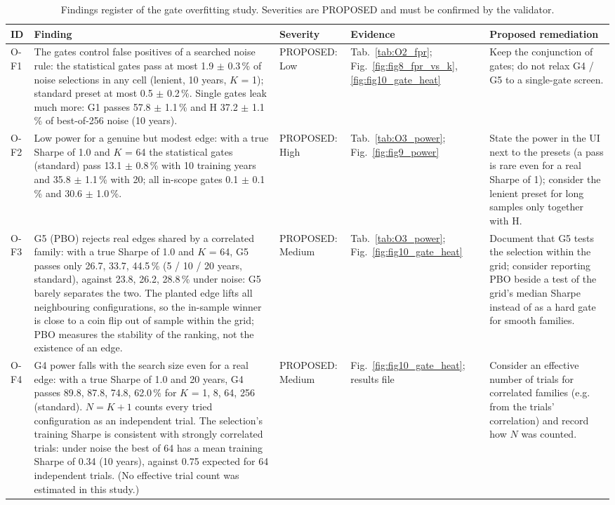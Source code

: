 \begin{table}[H]
\centering
\scriptsize
\caption{Findings register of the gate overfitting study. Severities are PROPOSED and must be confirmed by the validator.}
\label{tab:O6_findings}
\setlength{\tabcolsep}{3pt}
\begin{tabular}{>{\raggedright\arraybackslash}p{0.75cm}>{\raggedright\arraybackslash}p{6.8cm}>{\raggedright\arraybackslash}p{1.85cm}>{\raggedright\arraybackslash}p{2.2cm}>{\raggedright\arraybackslash}p{3.5cm}}
\toprule
ID & Finding & Severity & Evidence & Proposed remediation \\
\midrule
O-F1 & The gates control false positives of a searched noise rule: the statistical gates pass at most 1.9 $\pm$ 0.3\,\% of noise selections in any cell (lenient, 10 years, $K$ = 1); standard preset at most 0.5 $\pm$ 0.2\,\%. Single gates leak much more: G1 passes 57.8 $\pm$ 1.1\,\% and H 37.2 $\pm$ 1.1\,\% of best-of-256 noise (10 years). & PROPOSED: Low & Tab.~\ref{tab:O2_fpr}; Fig.~\ref{fig:fig8_fpr_vs_k}, \ref{fig:fig10_gate_heat} & Keep the conjunction of gates; do not relax G4 / G5 to a single-gate screen. \\
O-F2 & Low power for a genuine but modest edge: with a true Sharpe of 1.0 and $K$ = 64 the statistical gates (standard) pass 13.1 $\pm$ 0.8\,\% with 10 training years and 35.8 $\pm$ 1.1\,\% with 20; all in-scope gates 0.1 $\pm$ 0.1\,\% and 30.6 $\pm$ 1.0\,\%. & PROPOSED: High & Tab.~\ref{tab:O3_power}; Fig.~\ref{fig:fig9_power} & State the power in the UI next to the presets (a pass is rare even for a real Sharpe of 1); consider the lenient preset for long samples only together with H. \\
O-F3 & G5 (PBO) rejects real edges shared by a correlated family: with a true Sharpe of 1.0 and $K$ = 64, G5 passes only 26.7, 33.7, 44.5\,\% (5 / 10 / 20 years, standard), against 23.8, 26.2, 28.8\,\% under noise: G5 barely separates the two. The planted edge lifts all neighbouring configurations, so the in-sample winner is close to a coin flip out of sample within the grid; PBO measures the stability of the ranking, not the existence of an edge. & PROPOSED: Medium & Tab.~\ref{tab:O3_power}; Fig.~\ref{fig:fig10_gate_heat} & Document that G5 tests the selection within the grid; consider reporting PBO beside a test of the grid's median Sharpe instead of as a hard gate for smooth families. \\
O-F4 & G4 power falls with the search size even for a real edge: with a true Sharpe of 1.0 and 20 years, G4 passes 89.8, 87.8, 74.8, 62.0\,\% for $K$ = 1, 8, 64, 256 (standard). $N = K + 1$ counts every tried configuration as an independent trial. The selection's training Sharpe is consistent with strongly correlated trials: under noise the best of 64 has a mean training Sharpe of 0.34 (10 years), against 0.75 expected for 64 independent trials. (No effective trial count was estimated in this study.) & PROPOSED: Medium & Fig.~\ref{fig:fig10_gate_heat}; results file & Consider an effective number of trials for correlated families (e.g. from the trials' correlation) and record how $N$ was counted. \\

\end{tabular}
\end{table}
